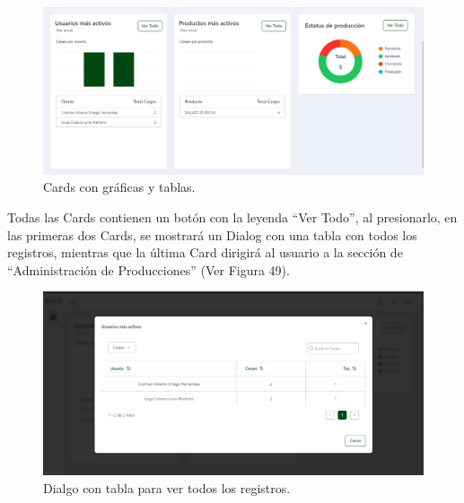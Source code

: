     \begin{figure}[H]
        \begin{center}
            \includegraphics[scale=0.35]{img/actividades/analitica-prod/graficas-cards.png}
            \caption{Cards con gráficas y tablas.}
            \label{fig:graficas-cards}
        \end{center}
    \end{figure}

Todas las Cards contienen un botón con la leyenda ``Ver Todo'', al presionarlo, en las primeras dos Cards, se mostrará un Dialog con una tabla con todos los registros, mientras que la última Card dirigirá al usuario a la sección de ``Administración de Producciones'' (Ver Figura 49).

    \begin{figure}[H]
        \begin{center}
            \includegraphics[scale=0.33]{img/actividades/analitica-prod/dialog-tabla.png}
            \caption{Dialgo con tabla para ver todos los registros.}
            \label{fig:dialog-tabla}
        \end{center}
    \end{figure}